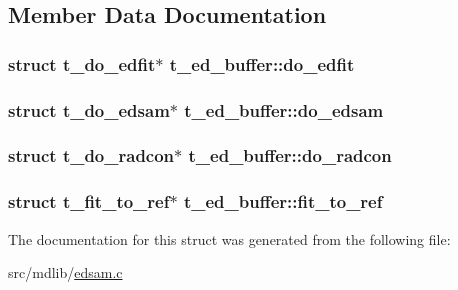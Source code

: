 \subsection{\-Member \-Data \-Documentation}
\hypertarget{structt__ed__buffer_a39f51c2ce34563b357af26fd1fbc7088}{
\subsubsection[{do\-\_\-edfit}]{\setlength{\rightskip}{0pt plus 5cm}struct {\bf t\-\_\-do\-\_\-edfit}$\ast$ {\bf t\-\_\-ed\-\_\-buffer\-::do\-\_\-edfit}}}\label{structt__ed__buffer_a39f51c2ce34563b357af26fd1fbc7088}
\hypertarget{structt__ed__buffer_affdc2038b5fb3f3094b313ee77baa15a}{
\subsubsection[{do\-\_\-edsam}]{\setlength{\rightskip}{0pt plus 5cm}struct {\bf t\-\_\-do\-\_\-edsam}$\ast$ {\bf t\-\_\-ed\-\_\-buffer\-::do\-\_\-edsam}}}\label{structt__ed__buffer_affdc2038b5fb3f3094b313ee77baa15a}
\hypertarget{structt__ed__buffer_a00da13304376a72401ead390eaebddb3}{
\subsubsection[{do\-\_\-radcon}]{\setlength{\rightskip}{0pt plus 5cm}struct {\bf t\-\_\-do\-\_\-radcon}$\ast$ {\bf t\-\_\-ed\-\_\-buffer\-::do\-\_\-radcon}}}\label{structt__ed__buffer_a00da13304376a72401ead390eaebddb3}
\hypertarget{structt__ed__buffer_a5c268eeae8e5347b3b6b563c38e47b03}{
\subsubsection[{fit\-\_\-to\-\_\-ref}]{\setlength{\rightskip}{0pt plus 5cm}struct {\bf t\-\_\-fit\-\_\-to\-\_\-ref}$\ast$ {\bf t\-\_\-ed\-\_\-buffer\-::fit\-\_\-to\-\_\-ref}}}\label{structt__ed__buffer_a5c268eeae8e5347b3b6b563c38e47b03}


\-The documentation for this struct was generated from the following file\-:\begin{DoxyCompactItemize}
\item 
src/mdlib/\hyperlink{edsam_8c}{edsam.\-c}\end{DoxyCompactItemize}
